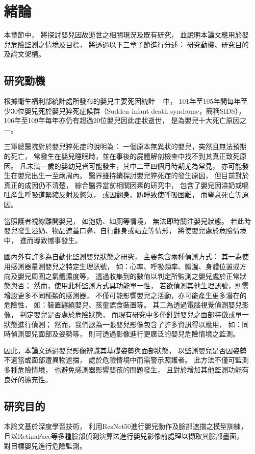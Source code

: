 \documentclass[class=NCU_thesis, crop=false]{standalone}
\begin{document}
\chapter{緒論}
本章節中，
將探討嬰兒因故逝世之相關現況及既有研究，
並說明本論文應用於嬰兒危險監測之情境及目標，
將透過以下三章子節進行分述：
研究動機、研究目的及論文架構。

\section{研究動機}
根據衛生福利部統計處所發布的嬰兒主要死因統計
~\cite{__2021}
中，
101年至105年間每年至少30位嬰兒死於嬰兒猝死症候群（Sudden infant death syndrome，簡稱SIDS），
106年至109年每年亦仍有超過20位嬰兒因此症狀逝世，
是為嬰兒十大死亡原因之一。

三軍總醫院對於嬰兒猝死症的說明為：
一個原本無異狀的嬰兒，突然且無法預期的死亡，
常發生在嬰兒睡眠時，並在事後的屍體解剖檢查中找不到其真正致死原因。
凡未滿一歲的嬰幼兒皆可能發生，其中二至四個月時期尤為常見，
亦可能發生在嬰兒出生一至兩周內。
醫界雖持續探討嬰兒猝死症的發生原因，
但目前對於真正的成因仍不清楚，
綜合醫界當前相關因素的研究中，
包含了嬰兒因溢奶或嘔吐產生呼吸道緊縮反射及憋氣，
或因翻身、趴睡致使呼吸困難，
而窒息死亡等原因。

當照護者視線離開嬰兒，
如泡奶、如廁等情境，
無法即時關注嬰兒狀態。
若此時嬰兒發生溢奶、物品遮蓋口鼻、自行翻身或站立等情形，
將使嬰兒處於危險情境中，
進而導致憾事發生。

國內外有許多為自動化監測嬰兒狀態之研究，
主要包含兩種偵測方式：
其一為使用感測器量測嬰兒之特定生理訊號，
如：心率、呼吸頻率、體溫、身體位置或方向及嬰兒周圍之氣體濃度等，
透過收集到的數值以判定所監測之嬰兒處於正常狀態與否；
然而，使用此種監測方式具功能單一性，
若欲偵測其他生理訊號，則需增設更多不同種類的感測器，
不僅可能影響嬰兒之活動，亦可能產生更多潛在的危險性，
如：裝置纏繞嬰兒、孩童誤食裝置等。
其二為透過電腦視覺偵測嬰兒影像，
判定嬰兒是否處於危險狀態，
而現有研究中多僅針對嬰兒之面部特徵或單一狀態進行偵測；
然而，我們認為一張嬰兒影像包含了許多資訊得以應用，
如：同時偵測嬰兒面部及姿勢等，
則可透過影像進行更廣泛的嬰兒危險情境之監測。

因此，本論文透過嬰兒影像辨識其基礎姿勢與面部狀態，
以監測嬰兒是否因姿勢不適當或面部遭異物遮擋，
處於危險情境中而需警示照護者。
此方法不僅可監測多種危險情境，
也避免感測器影響嬰孩的問題發生，
且對於增加其他監測功能有良好的擴充性。

\section{研究目的}
本論文基於深度學習技術，
利用ResNet50進行嬰兒動作及臉部遮擋之模型訓練，
且以RetinaFace等多種臉部偵測演算法進行嬰兒影像前處理以擷取其臉部畫面，
對目標嬰兒進行危險監測。
\end{document}
